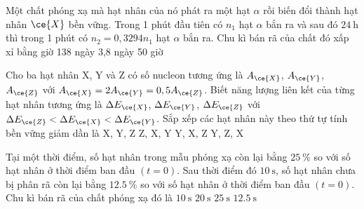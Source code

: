 \begin{ex}
	Một chất phóng xạ mà hạt nhân của nó phát ra một hạt $\alpha$ rồi biến đổi thành hạt nhân $\ce{X}$ bền vững. Trong 1 phút đầu tiên có $n_1$ hạt $\alpha$ bắn ra và sau đó $\SI{24}{\hour}$ thì trong 1 phút có $n_2=0,3294n_1$ hạt $\alpha$ bắn ra. Chu kì bán rã của chất đó xấp xỉ bằng
		\choice
	{ giờ}
	{138 ngày}
	{3,8 ngày}
	{50 giờ}
\end{ex}
\begin{ex}
	Cho ba hạt nhân X, Y và Z có số nucleon tương ứng là $A_{\ce{X}}$, $A_{\ce{Y}}$, $A_{\ce{Z}}$ với $A_{\ce{X}}=2A_{\ce{Y}}=0,5A_{\ce{Z}}$. Biết năng lượng liên kết của từng hạt nhân tương ứng là $\Delta E_{\ce{X}}$, $\Delta E_{\ce{Y}}$, $\Delta E_{\ce{Z}}$ với $\Delta E_{\ce{Z}}<\Delta E_{\ce{X}}<\Delta E_{\ce{Y}}$. Sắp xếp các hạt nhân này theo thứ tự tính bền vững giảm dần là
	\choice
	{X, Y, Z}
	{Z, X, Y}
	{\True Y, X, Z}
	{Y, Z, X}
	\loigiai{}
\end{ex}
\begin{ex}
	Tại một thời điểm, số hạt nhân trong mẫu phóng xạ còn lại bằng $\SI{25}{\percent}$ so với số hạt nhân ở thời điểm ban đầu $\left(t=0\right)$. Sau thời điểm đó $\SI{10}{\second}$, số hạt nhân chưa bị phân rã còn lại bằng $\SI{12.5}{\percent}$ so với số hạt nhân ở thời điểm ban đầu $\left(t=0\right)$. Chu kì bán rã của chất phóng xạ đó là
	\choice
	{\True $\SI{10}{\second}$}
	{$\SI{20}{\second}$}
	{$\SI{25}{\second}$}
	{$\SI{12.5}{\second}$}
\end{ex}

